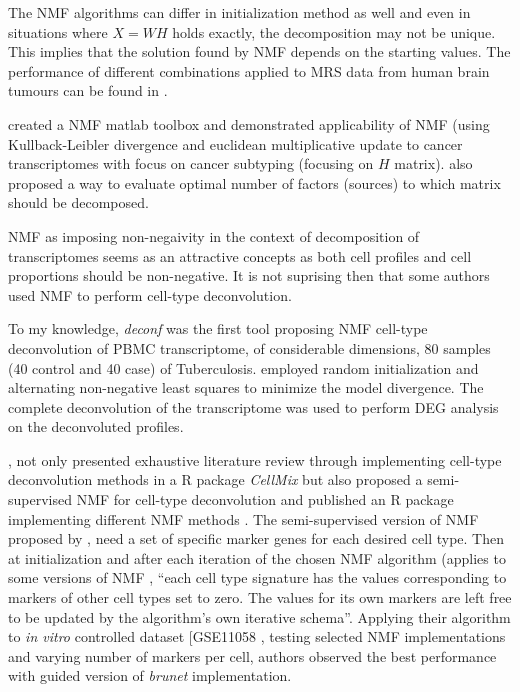 \documentclass[12pt,]{book}
\theoremstyle{definition}
\theoremstyle{definition}
\theoremstyle{definition}
\theoremstyle{remark}
\begin{document}
The NMF algorithms can differ in initialization method as well and even
in situations where \(X = WH\) holds exactly, the decomposition may not
be unique. This implies that the solution found by NMF depends on the
starting values. The performance of different combinations applied to
MRS data from human brain tumours can be found in
\citet{OrtegaMartorell2012}.

\citet{Brunet2004} created a NMF matlab toolbox and demonstrated
applicability of NMF (using Kullback-Leibler divergence and euclidean
multiplicative update \citep{Lee2000} to cancer transcriptomes with
focus on cancer subtyping (focusing on \(H\) matrix). \citet{Brunet2004}
also proposed a way to evaluate optimal number of factors (sources) to
which matrix should be decomposed.

NMF as imposing non-negaivity in the context of decomposition of
transcriptomes seems as an attractive concepts as both cell profiles and
cell proportions should be non-negative. It is not suprising then that
some authors used NMF to perform cell-type deconvolution.

To my knowledge, \emph{deconf} \citep{Repsilber2010} was the first tool
proposing NMF cell-type deconvolution of PBMC transcriptome, of
considerable dimensions, 80 samples (40 control and 40 case) of
Tuberculosis. \citet{Repsilber2010} employed random initialization and
alternating non-negative least squares to minimize the model divergence.
The complete deconvolution of the transcriptome was used to perform DEG
analysis on the deconvoluted profiles.

\citet{Shen-Orr2013}, not only presented exhaustive literature review
through implementing cell-type deconvolution methods in a R package
\emph{CellMix} \citep{Gaujoux2013} but also proposed a semi-supervised
NMF for cell-type deconvolution and published an R package implementing
different NMF methods \citep{Gaujoux2010}. The semi-supervised version
of NMF proposed by \citet{Gaujoux2013}, need a set of specific marker
genes for each desired cell type. Then at initialization and after each
iteration of the chosen NMF algorithm (applies to some versions of NMF
\citep{Seung1999, Brunet2004, PascualMontano2006}, ``each cell type
signature has the values corresponding to markers of other cell types
set to zero. The values for its own markers are left free to be updated
by the algorithm's own iterative schema''. Applying their algorithm to
\emph{in vitro} controlled dataset {[}GSE11058 \citep{Abbas2009},
testing selected NMF implementations and varying number of markers per
cell, authors observed the best performance with guided version of
\emph{brunet} \citep{Brunet2004} implementation.
\end{document}
